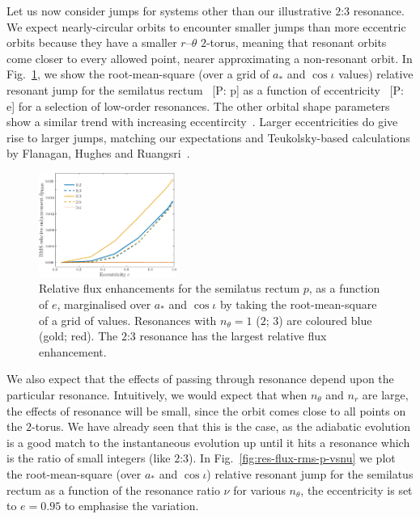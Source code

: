 \documentclass[aps,prd,amsfonts,amssymb,amsmath,nofootinbib,showpacs,superscriptaddress,twocolumn,floatfix]{revtex4-1}
\newcommand{\figref}[1]{Fig.~\ref{fig:#1}}
\newcommand{\pcm}[1]{{\color{blue}~\textsf{[P: #1]}}}
\begin{document}
Let us now consider jumps for systems other than our illustrative $2$:$3$ resonance. We expect nearly-circular orbits to encounter smaller jumps than more eccentric orbits because they have a smaller $r$--$\theta$ $2$-torus, meaning that resonant orbits come closer to every allowed point, nearer approximating a non-resonant orbit. In \figref{res-flux-rms-p}, we show the root-mean-square (over a grid of $a_\ast$ and $\cos\iota$ values) relative resonant jump for the semilatus rectum \pcm{p} as a function of eccentricity \pcm{e} for a selection of low-order resonances. The other orbital shape parameters show a similar trend with increasing eccentircity~\cite{ColeThesis2015}. Larger eccentricities do give rise to larger jumps, matching our expectations and Teukolsky-based calculations by Flanagan, Hughes and Ruangsri~\cite{Flanagan2012a}.

\begin{figure}
\centering
\includegraphics[width=0.4\textwidth]{Fig_e_rms_p}
\caption{\label{fig:res-flux-rms-p}Relative flux enhancements for the semilatus rectum $p$, as a function of $e$, marginalised over $a_\ast$ and $\cos\iota$ by taking the root-mean-square of a grid of values. Resonances with $n_\theta = 1$ ($2$; $3$) are coloured blue (gold; red). The $2$:$3$ resonance has the largest relative flux enhancement.}
\end{figure}

We also expect that the effects of passing through resonance depend upon the particular resonance. Intuitively, we would expect that when $n_\theta$ and $n_r$ are large, the effects of resonance will be small, since the orbit comes close to all points on the $2$-torus. We have already seen that this is the case, as the adiabatic evolution is a good match to the instantaneous evolution up until it hits a resonance which is the ratio of small integers (like $2$:$3$). In \figref{res-flux-rms-p-vsnu} we plot the root-mean-square (over $a_\ast$ and $\cos\iota$) relative resonant jump for the semilatus rectum as a function of the resonance ratio $\nu$ for various $n_\theta$, the eccentricity is set to $e=0.95$ to emphasise the variation.
\end{document}

